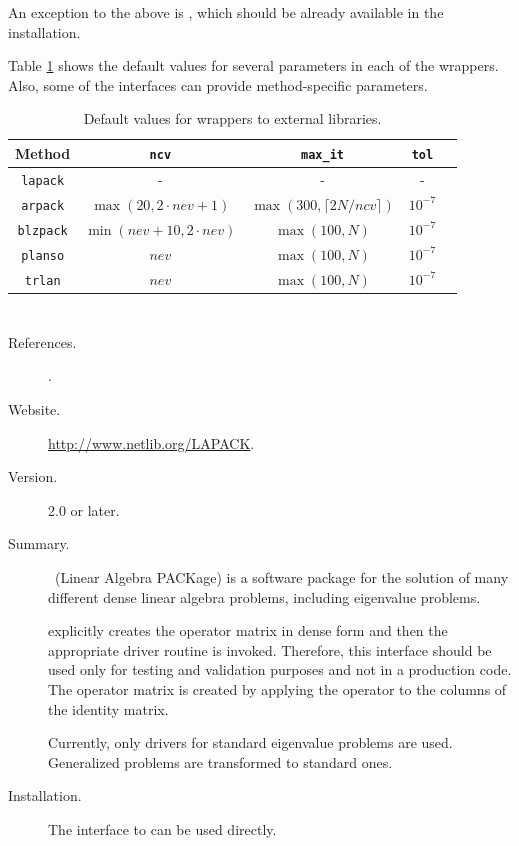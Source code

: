 	An exception to the above is \lapack, which should be already available in the \petsc{} installation.

	Table \ref{tab:defaults-ext} shows the default values for several parameters in each of the wrappers. Also, some of the interfaces can provide method-specific parameters.
\begin{table}[ht]
\centering
\begin{tabular}{ccccc} \hline
Method   &  \texttt{ncv} & \texttt{max\_it} & \texttt{tol} \\ \hline
\texttt{lapack}   &  - &         -          &    -      \\ 
\texttt{arpack}   &  $\max(20,2\!\cdot\!nev\!+\!\!1)$ & $\max(300,\lceil 2N/ncv\rceil)$ & $10^{-7}$ \\ 
\texttt{blzpack}  &  $\min(nev\!+\!\!10,2\!\cdot\!nev)$ & $\max(100,N)$ & $10^{-7}$ \\ 
\texttt{planso}   &  $nev$ & $\max(100,N)$ & $10^{-7}$ \\ 
\texttt{trlan}    &  $nev$ & $\max(100,N)$ & $10^{-7}$ \\ \hline
\end{tabular}
\caption{\label{tab:defaults-ext}Default values for wrappers to external
libraries.}
\end{table}

\section*{\underline{\lapack}}
	\begin{description}
	\item[References.]\citep{Anderson:1992:LUG}.
	\item[Website.] \url{http://www.netlib.org/LAPACK}.
	\item[Version.] 2.0 or later.
	\item[Summary.] \lapack\ (Linear Algebra PACKage) is a software package for the solution of many different dense linear algebra problems, including eigenvalue problems.

	\slepc explicitly creates the operator matrix in dense form and then the appropriate \lapack{} driver routine is invoked. Therefore, this interface should be used only for testing and validation purposes and not in a production code. The operator matrix is created by applying the operator to the columns of the identity matrix.

	Currently, only \lapack{} drivers for standard eigenvalue problems are
used. Generalized problems are transformed to standard ones.
	
	\item[Installation.]
	The \slepc interface to \lapack{} can be used directly.
	\end{description}


